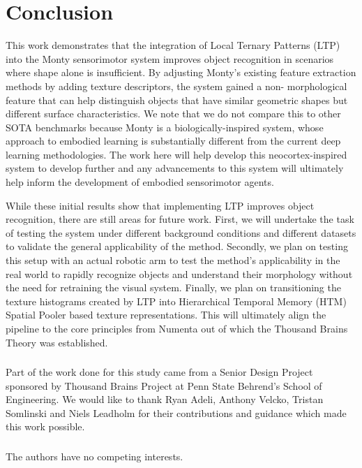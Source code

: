 \documentclass[runningheads]{llncs}
\begin{document}
\section{Conclusion}
This work demonstrates that the integration of Local Ternary Patterns (LTP) into the Monty sensorimotor system improves object recognition in scenarios where shape alone is insufficient. By adjusting Monty’s existing feature extraction methods by adding texture descriptors, the system gained a non- morphological feature that can help distinguish objects that have similar geometric shapes but different surface characteristics. We note that we do not compare this to other SOTA benchmarks because Monty is a biologically-inspired system, whose approach to embodied learning is substantially different from the current deep learning methodologies. The work here will help develop this neocortex-inspired system to develop further and any advancements to this system will ultimately help inform the development of embodied sensorimotor agents. 

While these initial results show that implementing LTP improves object recognition, there are still areas for future work. First, we will undertake the task of testing the system under different background conditions and different datasets to validate the general applicability of the method. Secondly, we plan on testing this setup with an actual robotic arm to test the method’s applicability in the real world to rapidly recognize objects and understand their morphology without the need for retraining the visual system. Finally, we plan on transitioning the texture histograms created by LTP into Hierarchical Temporal Memory (HTM) \cite{hawkins_hierarchical_2011} Spatial Pooler based texture representations. This will ultimately align the pipeline to the core principles from Numenta out of which the Thousand Brains Theory was established.   

\begin{credits}
\subsubsection{\ackname} Part of the work done for this study came from a Senior Design Project sponsored by Thousand Brains Project at Penn State Behrend's School of Engineering. We would like to thank Ryan Adeli, Anthony Velcko, Tristan Somlinski and Niels Leadholm for their contributions and guidance which made this work possible.

\subsubsection{\discintname}
The authors have no competing interests. 
\end{credits}



%
\end{document}
